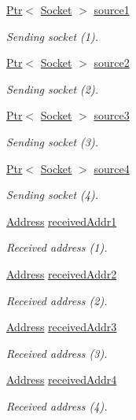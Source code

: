 \begin{DoxyCompactItemize}
\hyperlink{classns3_1_1Ptr}{Ptr}$<$ \hyperlink{classns3_1_1Socket}{Socket} $>$ \hyperlink{classDualStackTestCase_a54b138b91c944a0b15ab29b952b93a4b}{source1}
\begin{DoxyCompactList}\small\item\em Sending socket (1). \end{DoxyCompactList}\item 
\hyperlink{classns3_1_1Ptr}{Ptr}$<$ \hyperlink{classns3_1_1Socket}{Socket} $>$ \hyperlink{classDualStackTestCase_a61fd1d32c28557623bf74535044693bb}{source2}
\begin{DoxyCompactList}\small\item\em Sending socket (2). \end{DoxyCompactList}\item 
\hyperlink{classns3_1_1Ptr}{Ptr}$<$ \hyperlink{classns3_1_1Socket}{Socket} $>$ \hyperlink{classDualStackTestCase_ab7b8bea54582bc0ce4864dc184348813}{source3}
\begin{DoxyCompactList}\small\item\em Sending socket (3). \end{DoxyCompactList}\item 
\hyperlink{classns3_1_1Ptr}{Ptr}$<$ \hyperlink{classns3_1_1Socket}{Socket} $>$ \hyperlink{classDualStackTestCase_af8c2e51627dab5f1189b9339c68aa248}{source4}
\begin{DoxyCompactList}\small\item\em Sending socket (4). \end{DoxyCompactList}\item 
\hyperlink{classns3_1_1Address}{Address} \hyperlink{classDualStackTestCase_a852709037ee51bac771d4779613aae52}{received\+Addr1}
\begin{DoxyCompactList}\small\item\em Received address (1). \end{DoxyCompactList}\item 
\hyperlink{classns3_1_1Address}{Address} \hyperlink{classDualStackTestCase_a63218de46662d966207fcc8d978be471}{received\+Addr2}
\begin{DoxyCompactList}\small\item\em Received address (2). \end{DoxyCompactList}\item 
\hyperlink{classns3_1_1Address}{Address} \hyperlink{classDualStackTestCase_a3440b7105aff5dcd4194efa7e27ee89c}{received\+Addr3}
\begin{DoxyCompactList}\small\item\em Received address (3). \end{DoxyCompactList}\item 
\hyperlink{classns3_1_1Address}{Address} \hyperlink{classDualStackTestCase_a48bffe6296c0466bf3bc12bcbe4dd190}{received\+Addr4}
\begin{DoxyCompactList}\small\item\em Received address (4). \end{DoxyCompactList}\end{DoxyCompactItemize}
